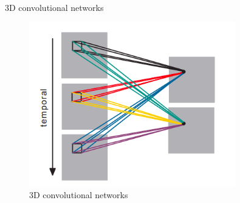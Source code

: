 \begin{frame}{3D convolutional networks}
    \begin{figure}[htp]
        \centering
        \includegraphics[width=0.8\textwidth]{images/v1survey/3d-cnn.png}
        \caption{3D convolutional networks}
    \end{figure}
\end{frame}

